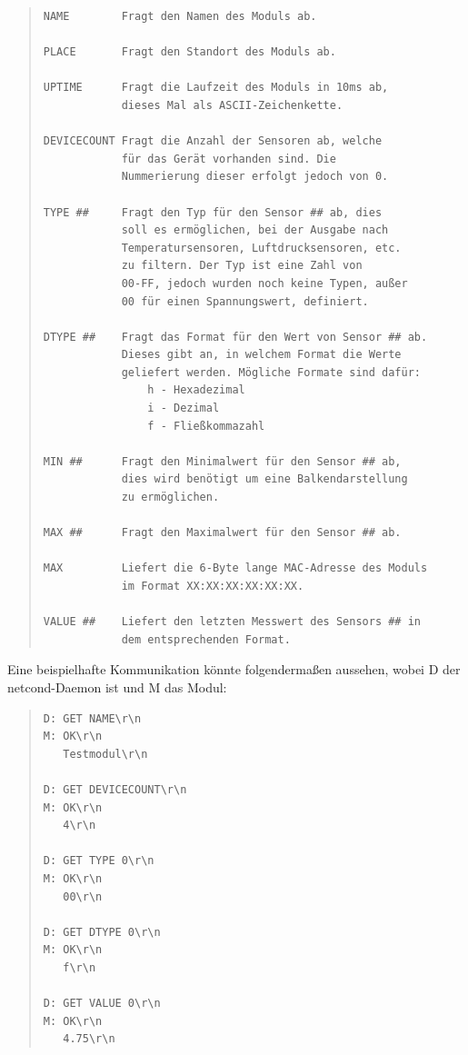 \documentclass[a4paper,14pt,headsepline]{scrartcl}
\begin{document}
\begin{quote}
\begin{verbatim}
NAME        Fragt den Namen des Moduls ab.

PLACE       Fragt den Standort des Moduls ab.

UPTIME      Fragt die Laufzeit des Moduls in 10ms ab,
            dieses Mal als ASCII-Zeichenkette.
            
DEVICECOUNT Fragt die Anzahl der Sensoren ab, welche
            für das Gerät vorhanden sind. Die
            Nummerierung dieser erfolgt jedoch von 0.

TYPE ##     Fragt den Typ für den Sensor ## ab, dies 
            soll es ermöglichen, bei der Ausgabe nach
            Temperatursensoren, Luftdrucksensoren, etc.
            zu filtern. Der Typ ist eine Zahl von
            00-FF, jedoch wurden noch keine Typen, außer
            00 für einen Spannungswert, definiert.
            
DTYPE ##    Fragt das Format für den Wert von Sensor ## ab.
            Dieses gibt an, in welchem Format die Werte
            geliefert werden. Mögliche Formate sind dafür:
                h - Hexadezimal
                i - Dezimal
                f - Fließkommazahl
                
MIN ##      Fragt den Minimalwert für den Sensor ## ab,
            dies wird benötigt um eine Balkendarstellung
            zu ermöglichen.
            
MAX ##      Fragt den Maximalwert für den Sensor ## ab.

MAX         Liefert die 6-Byte lange MAC-Adresse des Moduls
            im Format XX:XX:XX:XX:XX:XX.
            
VALUE ##    Liefert den letzten Messwert des Sensors ## in
            dem entsprechenden Format.
\end{verbatim}
\end{quote}
Eine beispielhafte Kommunikation könnte folgendermaßen aussehen, wobei D der netcond-Daemon ist und M das Modul:
\begin{quote}
\begin{verbatim}
D: GET NAME\r\n
M: OK\r\n
   Testmodul\r\n
   
D: GET DEVICECOUNT\r\n
M: OK\r\n
   4\r\n
   
D: GET TYPE 0\r\n
M: OK\r\n
   00\r\n
   
D: GET DTYPE 0\r\n
M: OK\r\n
   f\r\n
   
D: GET VALUE 0\r\n
M: OK\r\n
   4.75\r\n
\end{verbatim}
\end{quote}
\end{document}
